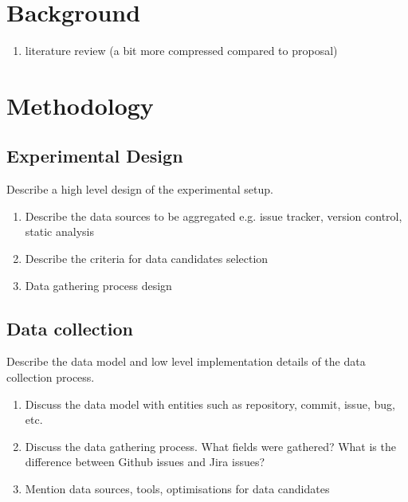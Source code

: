\documentclass{article}
\begin{document}
\section{Background}
\label{background}

\begin{enumerate}
  \item literature review (a bit more compressed compared to proposal)
\end{enumerate}

\section{Methodology}
\label{methodology}

\subsection{Experimental Design}
\label{experimental-design}

Describe a high level design of the experimental setup.

\begin{enumerate}
  \item Describe the data sources to be aggregated e.g. issue tracker, version
  control, static analysis
  \item Describe the criteria for data candidates selection
  \item Data gathering process design
\end{enumerate}

\subsection{Data collection}
\label{data-collection}

Describe the data model and low level implementation details of the data
collection process.

\begin{enumerate}
  \item Discuss the data model with entities such as repository, commit, issue,
  bug, etc. 
  \item Discuss the data gathering process. What fields were gathered? What is
  the difference between Github issues and Jira issues?
  \item Mention data sources, tools, optimisations for data candidates
\end{enumerate}
\end{document}
